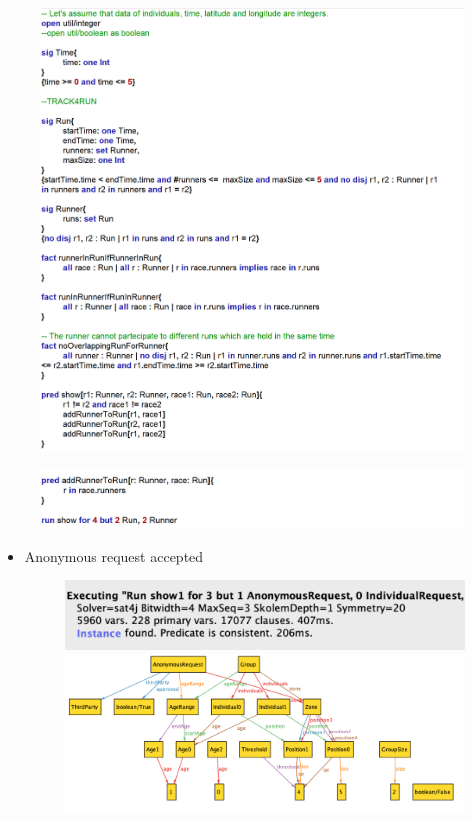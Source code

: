 \documentclass{article}
\begin{document}
\begin{legal}
\begin{figure}[H]
			\includegraphics[width=\linewidth]{./images/alloy/code/track4Run_1.PNG}
		\end{figure}
		\begin{figure}[H]
			\includegraphics[width=\linewidth]{./images/alloy/code/track4Run_2.PNG}
		\end{figure}		
		\begin{itemize}
			\newpage
			\item Anonymous request accepted
			\begin{figure}[H]
		  				\includegraphics[width=\linewidth]{./images/alloy/anonymous-request-true-Run.png}
		  				\includegraphics[width=\linewidth]{./images/alloy/anonymous-request-true-World.png}

\end{figure}
\end{itemize}
\end{legal}
\end{document}
